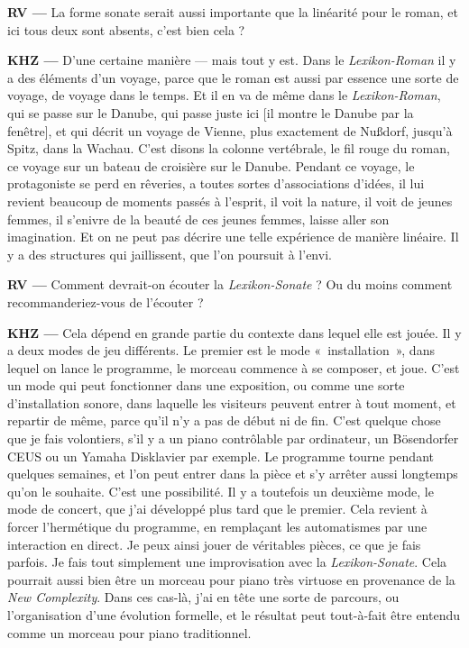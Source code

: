 \documentclass[a4paper,12pt]{article}
\newcommand{\guill}[1]{«~#1~»}
\begin{document}
\textbf{RV ---} La forme sonate serait aussi importante que la linéarité pour le roman, et ici tous deux sont absents, c'est bien cela ?

\textbf{KHZ ---} D'une certaine manière --- mais tout y est. Dans le \emph{Lexikon-Roman} il y a des éléments d'un voyage, parce que le roman est aussi par essence une sorte de voyage, de voyage dans le temps. Et il en va de même dans le \emph{Lexikon-Roman}, qui se passe sur le Danube, qui passe juste ici [il montre le Danube par la fenêtre], et qui décrit un voyage de Vienne, plus exactement de Nußdorf, jusqu'à Spitz, dans la Wachau. C'est disons la colonne vertébrale, le fil rouge du roman, ce voyage sur un bateau de croisière sur le Danube. Pendant ce voyage, le protagoniste se perd en rêveries, a toutes sortes d'associations d'idées, il lui revient beaucoup de moments passés à l'esprit, il voit la nature, il voit de jeunes femmes, il s'enivre de la beauté de ces jeunes femmes, laisse aller son imagination. Et on ne peut pas décrire une telle expérience de manière linéaire. Il y a des structures qui jaillissent, que l'on poursuit à l'envi.

\textbf{RV ---} Comment devrait-on écouter la \emph{Lexikon-Sonate} ? Ou du moins comment recommanderiez-vous de l'écouter ?

\textbf{KHZ ---} Cela dépend en grande partie du contexte dans lequel elle est jouée. Il y a deux modes de jeu différents. Le premier est le mode \guill{installation}, dans lequel on lance le programme, le morceau commence à se composer, et joue. C'est un mode qui peut fonctionner dans une exposition, ou comme une sorte d'installation sonore, dans laquelle les visiteurs peuvent entrer à tout moment, et repartir de même, parce qu'il n'y a pas de début ni de fin. C'est quelque chose que je fais volontiers, s'il y a un piano contrôlable par ordinateur, un Bösendorfer CEUS ou un Yamaha Disklavier par exemple. Le programme tourne pendant quelques semaines, et l'on peut entrer dans la pièce et s'y arrêter aussi longtemps qu'on le souhaite. C'est une possibilité. Il y a toutefois un deuxième mode, le mode de concert, que j'ai développé plus tard que le premier. Cela revient à forcer l'hermétique du programme, en remplaçant les automatismes par une interaction en direct. Je peux ainsi jouer de véritables pièces, ce que je fais parfois. Je fais tout simplement une improvisation avec la \emph{Lexikon-Sonate}. Cela pourrait aussi bien être un morceau pour piano très virtuose en provenance de la \emph{New Complexity}. Dans ces cas-là, j'ai en tête une sorte de parcours, ou l'organisation d'une évolution formelle, et le résultat peut tout-à-fait être entendu comme un morceau pour piano traditionnel.
\end{document}
